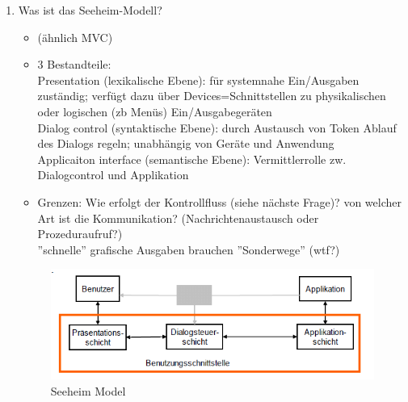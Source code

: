 \begin{enumerate}
	
	\item Was ist das Seeheim-Modell?
	\begin{itemize}
		\item (ähnlich MVC)
		\item 3 Bestandteile: \\
		Presentation (lexikalische Ebene): für systemnahe Ein/Ausgaben zuständig; verfügt dazu über Devices=Schnittstellen zu physikalischen oder logischen (zb Menüs) Ein/Ausgabegeräten\\
		Dialog control (syntaktische Ebene): durch Austausch von Token Ablauf des Dialogs regeln; unabhängig von Geräte und Anwendung\\
		Applicaiton interface (semantische Ebene): Vermittlerrolle zw. Dialogcontrol und Applikation
		\item Grenzen: Wie erfolgt der Kontrollfluss (siehe nächste Frage)? von welcher Art ist die Kommunikation? (Nachrichtenaustausch oder Prozeduraufruf?)\\
		''schnelle'' grafische Ausgaben brauchen ''Sonderwege'' (wtf?)
	\end{itemize}	
	\begin{figure}[!h]
		\centering
		\includegraphics[scale=0.5]{img/seeheim.png}
		\caption{Seeheim Model}
	\end{figure}
	

\end{enumerate}
